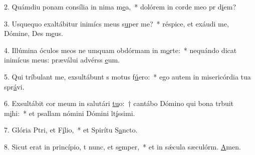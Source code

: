 2. Quámdiu ponam consília in nima m\uline{e}a,~* dolórem in corde meo pr d\uline{i}em?\par 
3. Usquequo exaltábitur inimícs meus s\uline{u}per me?~* réspice, et exáudi me, Dómine, Des m\uline{e}us.\par 
4. Illúmina óculos meos ne umquam obdórmam in m\uline{o}rte:~* nequándo dicat inimícus meus: præválui advérss \uline{e}um.\par 
5. Qui tríbulant me, exsultábunt s motus f\uline{ú}ero:~* ego autem in misericórdia tua spr\uline{á}vi.\par 
6. Exsultábit cor meum in salutári \uline{tu}o:~† cantábo Dómino qui bona trbuit m\uline{i}hi:~* et psallam nómini Dómini lt\uline{í}ssimi.\par 
7. Glória Ptri, et F\uline{í}lio,~* et Spirítu S\uline{a}ncto.\par 
8. Sicut erat in princípio, t nunc, et s\uline{e}mper,~* et in sǽcula sæculórm. \uline{A}men.\par 
